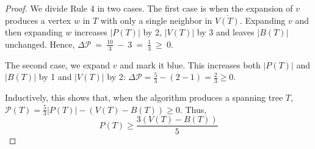 \documentclass[12pt]{article}
\begin{document}
\begin{proof}
  We divide Rule 4 in two cases.
  The first case is when the expansion of $v$ produces a vertex $w$ in $T$ with only a single neighbor in $\overline{V(T)}$.
  Expanding $v$ and then expanding $w$ increases $|P(T)|$ by 2, $|V(T)|$ by 3 and leaves $|B(T)|$ unchanged.
  Hence, $\Delta \mathcal{P}~=~\frac{10}{3}~-~3~=~\frac{1}{3}~\ge~0$.

  The second case, we expand $v$ and mark it blue.
  This increases both $|P(T)|$ and $|B(T)|$ by 1 and $|V(T)|$ by 2: $\Delta \mathcal{P} = \frac{5}{3} - (2 - 1) = \frac{2}{3} \ge 0$.

  Inductively, this shows that, when the algorithm produces a spanning tree $T$, $\mathcal{P}(T) = \frac{5}{3}|P(T)| - (V(T) - B(T)) \ge 0$.
  Thus,
  $$ P(T) \ge \frac{3(V(T) - B(T))}{5} $$

\end{proof}
\end{document}
